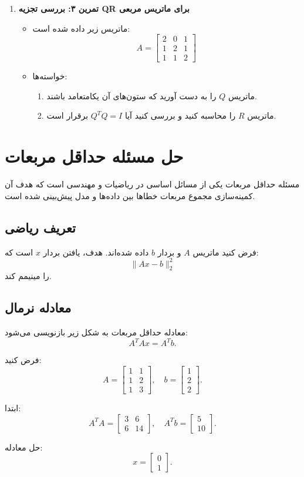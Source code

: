 \begin{enumerate}
	\item \textbf{تمرین ۳: بررسی تجزیه QR برای ماتریس مربعی}
	\begin{itemize}
		\item ماتریس زیر داده شده است:
		\[
		A = \begin{bmatrix}
			2 & 0 & 1 \\
			1 & 2 & 1 \\
			1 & 1 & 2
		\end{bmatrix}
		\]
		\item خواسته‌ها:
		\begin{enumerate}
			\item ماتریس \( Q \) را به دست آورید که ستون‌های آن یکامتعامد باشند.
			\item ماتریس \( R \) را محاسبه کنید و بررسی کنید آیا \( Q^T Q = I \) برقرار است.
		\end{enumerate}
	\end{itemize}
\end{enumerate}

\section{حل مسئله حداقل مربعات}
مسئله حداقل مربعات یکی از مسائل اساسی در ریاضیات و مهندسی است که هدف آن کمینه‌سازی مجموع مربعات خطاها بین داده‌ها و مدل پیش‌بینی شده است.

\subsection{تعریف ریاضی}
فرض کنید ماتریس \(A\) و بردار \(b\) داده شده‌اند. هدف، یافتن بردار \(x\) است که:
\[
\|Ax - b\|_2^2
\]
را مینیمم کند.

\subsection{معادله نرمال}
معادله حداقل مربعات به شکل زیر بازنویسی می‌شود:
\[
A^T A x = A^T b.
\]
\begin{example}
	فرض کنید:
	\[
	A = \begin{bmatrix}
		1 & 1 \\
		1 & 2 \\
		1 & 3
	\end{bmatrix}, \quad
	b = \begin{bmatrix}
		1 \\
		2 \\
		2
	\end{bmatrix}.
	\]
\end{example}
\begin{solution}
	
	ابتدا:
	\[
	A^T A = \begin{bmatrix}
		3 & 6 \\
		6 & 14
	\end{bmatrix}, \quad
	A^T b = \begin{bmatrix}
		5 \\
		10
	\end{bmatrix}.
	\]
	
	حل معادله:
	\[
	x = \begin{bmatrix}
		0 \\
		1
	\end{bmatrix}.
	\]
\end{solution}
